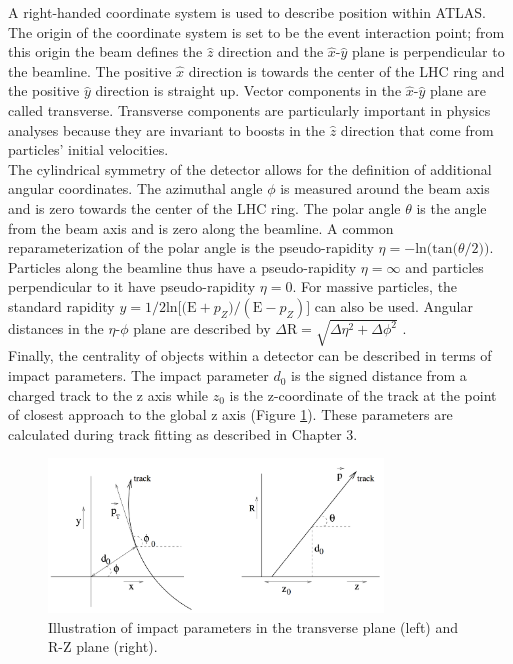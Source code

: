 A right-handed coordinate system is used to describe position within ATLAS. The origin of the coordinate system is set to be the event interaction point; from this origin the beam defines the $\hat{z}$ direction and the $\hat{x}\text{-}\hat{y}$ plane is perpendicular to the beamline. The positive $\hat{x}$ direction is towards the center of the LHC ring and the positive $\hat{y}$ direction is straight up. Vector components in the $\hat{x}\text {-}\hat{y}$ plane are called transverse. Transverse components are particularly important in physics analyses because they are invariant to boosts in the $\hat{z}$ direction that come from particles' initial velocities.\\

The cylindrical symmetry of the detector allows for the definition of additional angular coordinates. The azimuthal angle $\phi$ is measured around the beam axis and is zero towards the center of the LHC ring.  The polar angle $\theta$ is the angle from the beam axis and is zero along the beamline. A common reparameterization of the polar angle is the pseudo-rapidity $\eta=-\text{ln(tan(}\theta/2))$. Particles along the beamline thus have a pseudo-rapidity $\eta=\infty$ and particles perpendicular to it have pseudo-rapidity $\eta=0$. For massive particles, the standard rapidity $y=1/2\text{ln[(E}+p_Z)/(\text{E}-p_Z)]$ can also be used. Angular distances in the $\eta\text{-}\phi$ plane are described by $\Delta\text{R}=\sqrt{\Delta\eta^2+\Delta\phi^2}$ \cite{atlas}.\\

Finally, the centrality of objects within a detector can be described in terms of impact parameters. The impact parameter $d_0$ is the signed distance from a charged track to the z axis while $z_0$ is the z-coordinate of the track at the point of closest approach to the global z axis (Figure \ref{fig:impac_params}). These parameters are calculated during track fitting as described in Chapter 3.

\begin{figure}[h]
    \centering
    \includegraphics[width=3.5in]{figures/chapter2/impact_params.png}
    \caption{Illustration of impact parameters in the transverse plane (left) and R-Z plane (right).}
    \label{fig:impac_params}
\end{figure}

